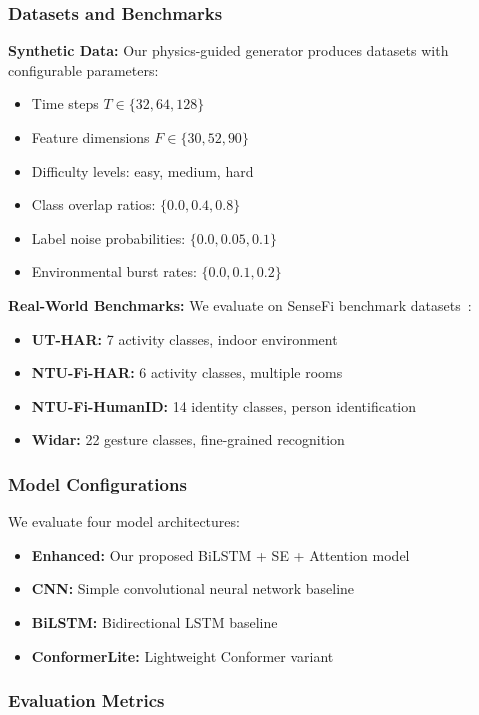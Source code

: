 \documentclass[journal]{IEEEtran}
\begin{document}
\subsubsection{Datasets and Benchmarks}

\textbf{Synthetic Data:} Our physics-guided generator produces datasets with configurable parameters:
\begin{itemize}
\item Time steps $T \in \{32, 64, 128\}$
\item Feature dimensions $F \in \{30, 52, 90\}$
\item Difficulty levels: easy, medium, hard
\item Class overlap ratios: $\{0.0, 0.4, 0.8\}$
\item Label noise probabilities: $\{0.0, 0.05, 0.1\}$
\item Environmental burst rates: $\{0.0, 0.1, 0.2\}$
\end{itemize}

\textbf{Real-World Benchmarks:} We evaluate on SenseFi benchmark datasets~\cite{yang2023sensefi}:
\begin{itemize}
\item \textbf{UT-HAR:} 7 activity classes, indoor environment
\item \textbf{NTU-Fi-HAR:} 6 activity classes, multiple rooms
\item \textbf{NTU-Fi-HumanID:} 14 identity classes, person identification
\item \textbf{Widar:} 22 gesture classes, fine-grained recognition
\end{itemize}

\subsubsection{Model Configurations}

We evaluate four model architectures:
\begin{itemize}
\item \textbf{Enhanced:} Our proposed BiLSTM + SE + Attention model
\item \textbf{CNN:} Simple convolutional neural network baseline
\item \textbf{BiLSTM:} Bidirectional LSTM baseline
\item \textbf{ConformerLite:} Lightweight Conformer variant
\end{itemize}

\subsubsection{Evaluation Metrics}
\end{document}

